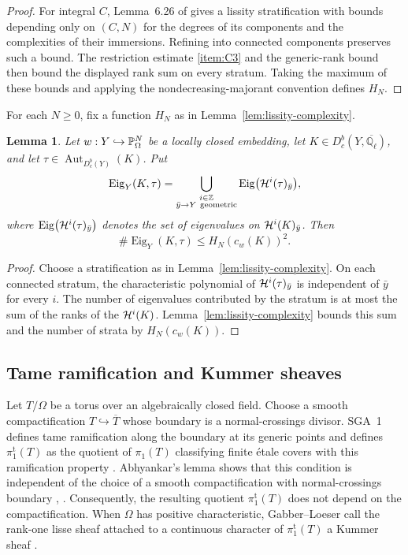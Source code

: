 \documentclass[12pt,reqno]{amsart}
\theoremstyle{definition}
\theoremstyle{plain}
\newtheorem{lem}[para]{Lemma}
\theoremstyle{definition}
\theoremstyle{remark}
\newcommand{\bbQ}{\mathbb{Q}}  \newcommand{\bbR}{\mathbb{R}}
\newcommand{\ol}[1]{\overline{#1}}
\newcommand{\Ql}{\bbQ_{\ell}}
\newcommand{\Db}{D^b_c}
\newcommand{\Eig}{\operatorname{Eig}}
\begin{document}
\begin{proof}
For integral \(C\), Lemma~6.26 of \cite{SFFK23} gives a lissity stratification with bounds depending only
on \((C,N)\) for the degrees of its components and the complexities of their immersions.  Refining into
connected components preserves such a bound.  The restriction estimate \ref{item:C3} and the
generic-rank bound \cite[Prop.~3.4]{SFFK23} then bound the displayed rank sum on every stratum.  Taking the
maximum of these bounds and applying the nondecreasing-majorant convention defines \(H_N\).
\end{proof}

For each \(N\ge0\), fix a function \(H_N\) as in Lemma~\ref{lem:lissity-complexity}.

\begin{lem}
\label{lem:eigenvalue-strata}
Let \(w:Y\hookrightarrow\mathbb{P}^N_\Omega\) be a locally closed embedding, let
\(K\in\Db(Y,\ol\Ql)\), and let \(\tau\in\operatorname{Aut}_{\Db(Y)}(K)\).  Put
\[
        \Eig_Y(K,\tau)
        =
        \bigcup_{\substack{i\in\mathbb Z\\ \bar y\to Y\ \mathrm{geometric}}}
        \Eig\bigl(\cH^i(\tau)_{\bar y}\bigr),
\]
where \(\Eig\bigl(\cH^i(\tau)_{\bar y}\bigr)\) denotes the set of eigenvalues on
\(\mathcal{H}^i(K)_{\bar y}\).  Then
\[
        \#\Eig_Y(K,\tau)\le H_N(c_w(K))^2.
\]
\end{lem}

\begin{proof}
Choose a stratification as in Lemma~\ref{lem:lissity-complexity}.  On each connected stratum, the
characteristic polynomial of \(\mathcal{H}^i(\tau)_{\bar y}\) is independent of \(\bar y\) for every \(i\).  The
number of eigenvalues contributed by the stratum is at most the sum of the ranks of the \(\mathcal{H}^i(K)\).
Lemma~\ref{lem:lissity-complexity} bounds this sum and the number of strata by \(H_N(c_w(K))\).
\end{proof}

\subsection{Tame ramification and Kummer sheaves}
\label{sec:tame-kummer}

Let \(T/\Omega\) be a torus over an algebraically closed field.  Choose a smooth compactification
\(T\hookrightarrow\overline T\) whose boundary is a normal-crossings divisor.  SGA~1 defines tame
ramification along the boundary at its generic points and defines \(\pi_1^{\mathrm t}(T)\) as the quotient
of \(\pi_1(T)\) classifying finite \'etale covers with this ramification property
\cite[Exp.~XIII, 2.1.1, 2.1.3, and Rem.~2.3(c)]{SGA1}.  Abhyankar's lemma shows that this condition is
independent of the choice of a smooth compactification with normal-crossings boundary
\cite[Exp.~XIII, Prop.~5.2]{SGA1}, \cite[\S1.9]{GabberLoeser1996}.  Consequently, the resulting quotient
\(\pi_1^{\mathrm t}(T)\) does not depend on the compactification.  When \(\Omega\) has positive
characteristic, Gabber--Loeser call the rank-one lisse sheaf attached to a continuous character of
\(\pi_1^{\mathrm t}(T)\) a Kummer sheaf \cite[\S\S1.3--1.4]{GabberLoeser1996}.
\end{document}
